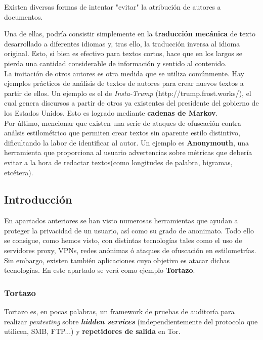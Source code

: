 Existen diversas formas de intentar "evitar" la atribución de autores a documentos. 

Una de ellas, podría consistir simplemente en la \textbf{traducción mecánica} de texto desarrollado a diferentes idiomas y, tras ello, la traducción inversa al idioma original. Esto, si bien es efectivo para textos cortos, hace que en los largos se pierda una cantidad considerable de información y sentido al contenido.\\
La imitación de otros autores es otra medida que se utiliza comúnmente. Hay ejemplos prácticos de análisis de textos de autores para crear nuevos textos a partir de ellos. Un ejemplo es el de \textit{Insta-Trump} (http://trump.frost.works/), el cual genera discursos a partir de otros ya existentes del presidente del gobierno de los Estados Unidos. Esto es logrado mediante \textbf{cadenas de Markov}.\\
Por último, mencionar que existen una serie de ataques de ofuscación contra análsis estilométrico que permiten crear textos sin aparente estilo distintivo, dificultando la labor de identificar al autor.
Un ejemplo es \textbf{Anonymouth}, una herramienta que proporciona al usuario advertencias sobre métricas que debería evitar a la hora de redactar textos(como longitudes de palabra, bigramas, etcétera).

 \label{sec:identificacion}
\subsection{Introducción}

En apartados anteriores se han visto numerosas herramientas que ayudan a proteger la privacidad de un usuario, así como su grado de anonimato. Todo ello se consigue, como hemos visto, con distintas tecnologías tales como el uso de servidores proxy, VPNs, redes anónimas ó ataques de ofuscación en estilometrías. 
Sin embargo, existen también aplicaciones cuyo objetivo es atacar dichas tecnologías. En este apartado se verá como ejemplo \textbf{Tortazo}.

\subsubsection{Tortazo}
Tortazo es, en pocas palabras, un framework de pruebas de auditoría para realizar \textit{pentesting} sobre \textit{\textbf{hidden services}} (independientemente del protocolo que utilicen, SMB, FTP...) y \textbf{repetidores de salida} en Tor.

